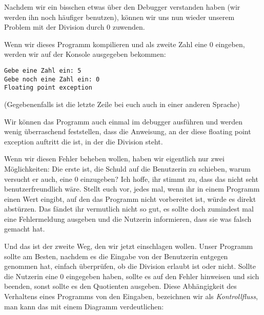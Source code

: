 
Nachdem wir ein bisschen etwas über den Debugger verstanden haben (wir werden
ihn noch häufiger benutzen), können wir uns nun wieder unserem Problem mit der
Division durch 0 zuwenden.


Wenn wir dieses Programm kompilieren und als zweite Zahl eine 0 eingeben,
werden wir auf der Konsole ausgegeben bekommen:
\begin{verbatim}
Gebe eine Zahl ein: 5
Gebe noch eine Zahl ein: 0
Floating point exception
\end{verbatim}
(Gegebenenfalls ist die letzte Zeile bei euch auch in einer anderen Sprache)

Wir können das Programm auch einmal im debugger ausführen und werden wenig
überraschend feststellen, dass die Anweisung, an der diese floating point
exception auftritt die ist, in der die Division steht.

Wenn wir diesen Fehler beheben wollen, haben wir eigentlich nur zwei
Möglichkeiten: Die erste ist, die Schuld auf die Benutzerin zu schieben, warum
versucht er auch, eine 0 einzugeben? Ich hoffe, ihr stimmt zu, dass das nicht
seht benutzerfreundlich wäre. Stellt euch vor, jedes mal, wenn ihr in einem
Programm einen Wert eingibt, auf den das Programm nicht vorbereitet ist, würde
es direkt abstürzen. Das fändet ihr vermutlich nicht so gut, es sollte doch
zumindest mal eine Fehlermeldung ausgeben und die Nutzerin informieren, dass sie
was falsch gemacht hat.

Und das ist der zweite Weg, den wir jetzt einschlagen wollen. Unser Programm
sollte am Besten, nachdem es die Eingabe von der Benutzerin entgegen genommen
hat, einfach überprüfen, ob die Division erlaubt ist oder nicht. Sollte die
Nutzerin eine 0 eingegeben haben, sollte es auf den Fehler hinweisen und sich
beenden, sonst sollte es den Quotienten ausgeben. Diese Abhängigkeit des
Verhaltens eines Programms von den Eingaben, bezeichnen wir als
\emph{Kontrollfluss}, man kann das mit einem Diagramm verdeutlichen:

\begin{center}
\end{center}

